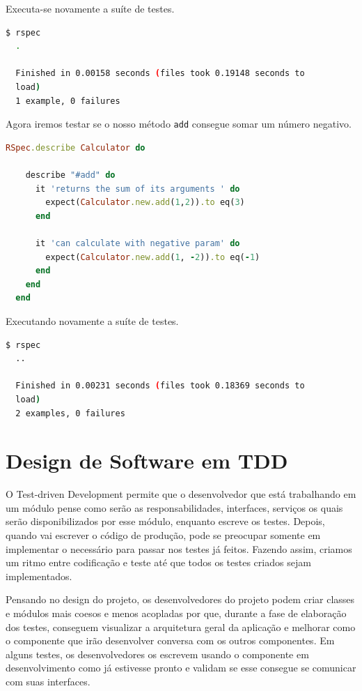 \documentclass[12pt]{article}
\newcommand{\code}[1]{\texttt{#1}}
\begin{document}
  Executa-se novamente a suíte de testes.

  \begin{lstlisting}[language=bash]
  $ rspec
  .

  Finished in 0.00158 seconds (files took 0.19148 seconds to 
  load)
  1 example, 0 failures
  \end{lstlisting}

  Agora iremos testar se o nosso método \code{add} consegue somar um número
  negativo.

  \begin{lstlisting}[language=Ruby]
  RSpec.describe Calculator do

    describe "#add" do
      it 'returns the sum of its arguments ' do
        expect(Calculator.new.add(1,2)).to eq(3)
      end

      it 'can calculate with negative param' do
        expect(Calculator.new.add(1, -2)).to eq(-1)
      end
    end
  end
  \end{lstlisting}

  Executando novamente a suíte de testes.

  \begin{lstlisting}[language=bash]
  $ rspec
  ..

  Finished in 0.00231 seconds (files took 0.18369 seconds to 
  load)
  2 examples, 0 failures
  \end{lstlisting}

  \section{Design de Software em TDD}

  O Test-driven Development permite que o desenvolvedor que está trabalhando 
  em um módulo pense como serão as responsabilidades, interfaces, serviços os 
  quais serão disponibilizados por esse módulo, enquanto escreve os testes. 
  Depois, quando vai escrever o código de produção, pode se preocupar somente em
  implementar o necessário para passar nos testes já feitos. Fazendo assim, 
  criamos um ritmo entre codificação e teste até que todos os testes criados 
  sejam implementados.

  Pensando no design do projeto, os desenvolvedores do projeto podem criar
  classes e módulos mais coesos e menos acopladas por que, durante a fase de 
  elaboração dos testes, conseguem visualizar a arquitetura geral da aplicação e
  melhorar como o componente que irão desenvolver conversa com os outros 
  componentes. Em alguns testes, os desenvolvedores os escrevem usando o 
  componente em desenvolvimento como já estivesse pronto e validam se
  esse consegue se comunicar com suas interfaces.
\end{document}
